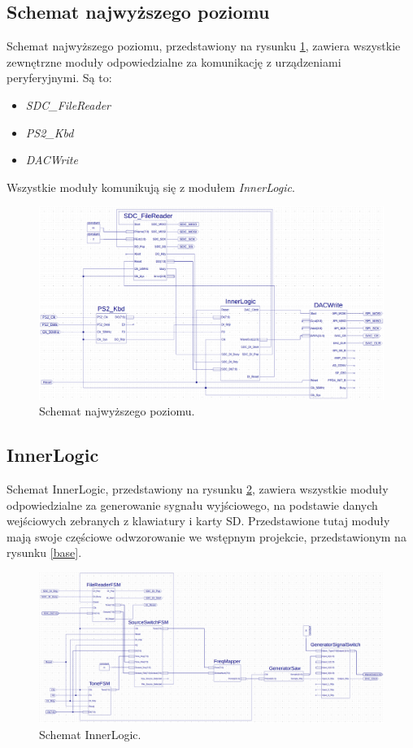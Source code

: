 \documentclass[12pt]{article}
\begin{document}
\subsection{Schemat najwyższego poziomu}
Schemat najwyższego poziomu, przedstawiony na rysunku \ref{sch:main}, zawiera wszystkie zewnętrzne moduły odpowiedzialne za komunikację z urządzeniami peryferyjnymi. Są to:
\begin{itemize}[noitemsep]
  \item \textit{SDC\_FileReader}
  \item \textit{PS2\_Kbd}
  \item \textit{DACWrite}
\end{itemize}
Wszystkie moduły komunikują się z modułem \textit{InnerLogic}.


\begin{figure}[h]
  \centering
  \includegraphics[width=\linewidth]{images/main}
  \caption{Schemat najwyższego poziomu.}
  \label{sch:main}
\end{figure}

\subsection{InnerLogic}

Schemat InnerLogic, przedstawiony na rysunku \ref{sch:inner}, zawiera wszystkie moduły odpowiedzialne za generowanie sygnału wyjściowego, na podstawie danych wejściowych zebranych z klawiatury i karty SD. Przedstawione tutaj moduły mają swoje częściowe odwzorowanie we wstępnym projekcie, przedstawionym na rysunku \ref{base}.

\begin{figure}[h]
  \centering
  \includegraphics[width=\linewidth]{images/inner}
  \caption{Schemat InnerLogic.}
  \label{sch:inner}
\end{figure}
\end{document}
